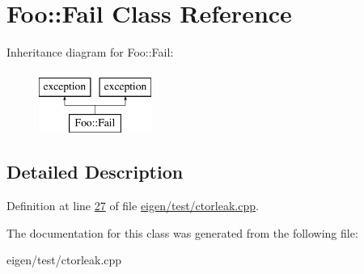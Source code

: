 \hypertarget{class_foo_1_1_fail}{}\section{Foo\+:\+:Fail Class Reference}
\label{class_foo_1_1_fail}
Inheritance diagram for Foo\+:\+:Fail\+:\begin{figure}[H]
\begin{center}
\leavevmode
\includegraphics[height=2.000000cm]{class_foo_1_1_fail}
\end{center}
\end{figure}


\subsection{Detailed Description}


Definition at line \hyperlink{eigen_2test_2ctorleak_8cpp_source_l00027}{27} of file \hyperlink{eigen_2test_2ctorleak_8cpp_source}{eigen/test/ctorleak.\+cpp}.



The documentation for this class was generated from the following file\+:\begin{DoxyCompactItemize}
\item 
eigen/test/ctorleak.\+cpp\end{DoxyCompactItemize}
